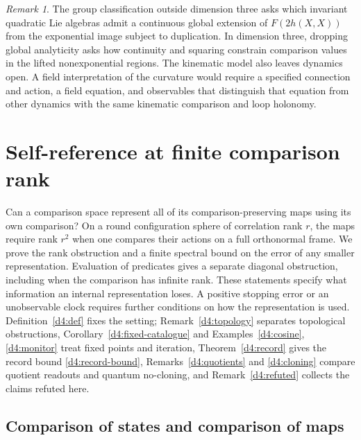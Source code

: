 \documentclass[11pt,reqno]{amsart}
\theoremstyle{definition}
\theoremstyle{remark}
\newtheorem{remark}[theorem]{Remark}
\numberwithin{equation}{section}
\begin{document}
\begin{remark}\label{m3:programme}
The group classification outside dimension three asks which
invariant quadratic Lie algebras admit a continuous global
extension of \(F(2h(X,X))\) from the exponential image
subject to duplication. In dimension three, dropping global
analyticity asks how continuity and squaring constrain comparison
values in the lifted nonexponential regions. The kinematic model
also leaves dynamics open. A field interpretation of the
curvature would require a specified connection and action,
a field equation, and observables that distinguish that equation
from other dynamics with the same kinematic comparison and
loop holonomy.
\end{remark}

\section{Self-reference at finite comparison rank}\label{sec:d4}

Can a comparison space represent all of its comparison-preserving maps using
its own comparison? On a round configuration sphere of correlation rank \(r\),
the maps require rank \(r^2\) when one compares their actions on a full
orthonormal frame. We prove the rank obstruction and a finite spectral bound
on the error of any smaller representation. Evaluation of predicates gives
a separate diagonal obstruction, including when the comparison has infinite
rank. These statements specify what information an internal representation
loses. A positive stopping error or an unobservable clock requires further
conditions on how the representation is used.  Definition~\ref{d4:def} fixes the setting; Remark~\ref{d4:topology} separates
topological obstructions, Corollary~\ref{d4:fixed-catalogue} and Examples~\ref{d4:cosine}, \ref{d4:monitor} treat fixed points and
iteration, Theorem~\ref{d4:record} gives the record bound \eqref{d4:record-bound}, Remarks~\ref{d4:quotients} and \ref{d4:cloning} compare
quotient readouts and quantum no-cloning, and Remark~\ref{d4:refuted} collects the claims refuted here.

\subsection*{Comparison of states and comparison of maps}
\end{document}
